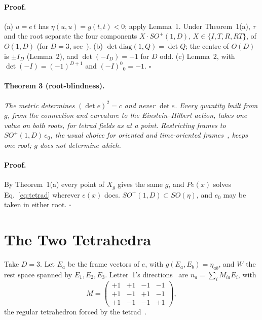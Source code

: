 \documentclass[twocolumn]{iopjournal}
\begin{document}
\paragraph{Proof.} (a) $u = e\,t$ has $\eta(u,u) = g(t,t) < 0$; apply
Lemma~1. Under Theorem~1(a), $\tau$ and the root separate the four
components $X \cdot SO^+(1,D)$, $X \in \{I, T, R, RT\}$, of
$O(1,D)$ (for $D = 3$, see~\cite{Weinberg1972}). (b) $\det \mathrm{diag}(1, Q) = \det Q$;
the centre of $O(D)$ is $\pm I_D$ (Lemma~2), and
$\det(-I_D) = -1$ for $D$ odd. (c) Lemma~2, with
$\det(-I) = (-1)^{D+1}$ and $(-I)^0{}_0 = -1$. \hfill $\square$

\paragraph{Theorem 3 (root-blindness).} \textit{The metric determines
$(\det e)^2 = c$ and never $\det e$. Every quantity built from $g$,
from the connection and curvature to the Einstein--Hilbert action,
takes one value on both roots, for
tetrad fields as at a point. Restricting frames to
$SO^+(1,D)\,e_0$, the usual choice for oriented and time-oriented
frames~\cite{Wald1984,Hehl1976}, keeps one root; $g$ does not
determine which.}

\paragraph{Proof.} By Theorem~1(a) every point of $X_g$ gives the same
$g$, and $Pe(x)$ solves Eq.~\eqref{eq:tetrad} wherever $e(x)$ does.
$SO^+(1,D) \subset SO(\eta)$, and $e_0$ may be taken in either root.
\hfill $\square$


\section*{The Two Tetrahedra}

Take $D = 3$. Let $E_a$ be the frame vectors of $e$, with
$g(E_a, E_b) = \eta_{ab}$, and $W$ the rest space spanned by
$E_1, E_2, E_3$. Letter~1's directions~\cite{Nelson2026a} are
$n_a = \sum_i M_{ia} E_i$, with
\begin{equation}
  M = \begin{pmatrix}
    +1 & +1 & -1 & -1 \\
    +1 & -1 & +1 & -1 \\
    +1 & -1 & -1 & +1
  \end{pmatrix},
  \label{eq:M}
\end{equation}
the regular tetrahedron forced by the tetrad~\cite{NelsonForced}.
\end{document}
